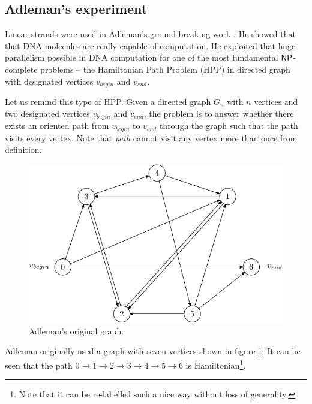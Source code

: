 	\subsection{Adleman's experiment}
	\label{sec:adleman}
		
		Linear strands were used in Adleman's ground-breaking work \cite{adleman94}. He showed that that DNA molecules are really capable of computation. He exploited that huge parallelism possible in DNA computation for one of the most fundamental $\mathsf{NP}$-complete problems -- the Hamiltonian Path Problem (HPP) in directed graph with designated vertices $v_{begin}$ and $v_{end}$.
		
		Let us remind this type of HPP. Given a directed graph $G_n$ with $n$ vertices and two designated vertices $v_{begin}$ and $v_{end}$, the problem is to answer whether there exists an oriented path from $v_{begin}$ to $v_{end}$ through the graph such that the path visits every vertex. Note that {\em path} cannot visit any vertex more than once from definition.
		
		\begin{figure}[H]
		\begin{center}
			\includegraphics{./figures/adleman_graph.pdf}
			\caption{Adleman's original graph.}
			\label{fig:adleman_graph}
		\end{center}
		\end{figure}
		
		Adleman originally used a graph with seven vertices shown in figure \ref{fig:adleman_graph}. It can be seen that the path $0 \rightarrow 1 \rightarrow 2 \rightarrow 3 \rightarrow 4 \rightarrow 5 \rightarrow 6$ is Hamiltonian\footnote{Note that it can be re-labelled such a nice way without loss of generality.}.
		
